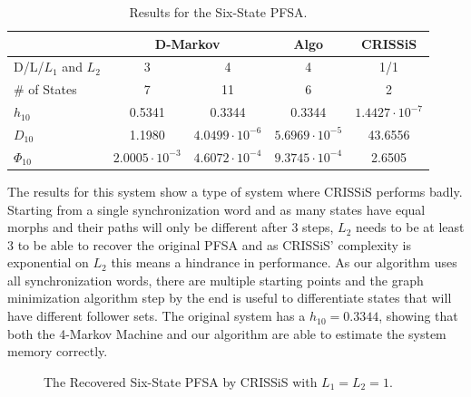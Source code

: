 {\begin{table}
\centering
\begin{tabular}{|l|c|c|c|c|}
\hline
 & \multicolumn{2}{c|}{\textbf{D-Markov}} & \textbf{Algo} & \textbf{CRISSiS}\\
 \hline
D/L/$L_1$ and $L_2$ & 3 & 4 & 4 & 1/1\\
\hline
\# of States & 7 & 11 & 6 & 2 \\ 
$h_{10}$ & 0.5341 & 0.3344 & 0.3344 & $1.4427\cdot 10^{-7}$ \\
$D_{10}$ & 1.1980 & $4.0499\cdot 10^{-6}$ & $5.6969\cdot10^{-5}$ &  43.6556\\
$\Phi_{10}$ & $2.0005\cdot 10^{-3}$ & $4.6072\cdot 10^{-4}$ & $9.3745\cdot10^{-4}$ & 2.6505\\
 \hline
\end{tabular}
\caption{Results for the Six-State PFSA. \label{tab:sixstate}}
\end{table}

The results for this system show a type of system where CRISSiS performs badly. Starting from a single synchronization word and as many states have equal morphs and their paths will only be different after 3 steps, $L_2$ needs to be at least 3 to be able to recover the original PFSA and as CRISSiS' complexity is exponential on $L_2$ this means a hindrance in performance. As our algorithm uses all synchronization words, there are multiple starting points and the graph minimization algorithm step by the end is useful to differentiate states that will have different follower sets. The original system has a $h_{10} = 0.3344$, showing that both the 4-Markov Machine and our algorithm are able to estimate the system memory correctly.

\begin{figure}
\centering
{}
\caption{The Recovered Six-State PFSA by CRISSiS with $L_1 = L_2 = 1$.\label{fig:sixstatecrissis}}
\end{figure}

}
